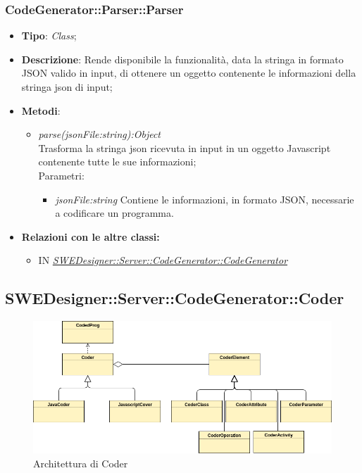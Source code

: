 \documentclass[../DefinizioneDiProdotto.tex]{subfiles}
\begin{document}
			\subsubsection{CodeGenerator::Parser::Parser}
			\hypertarget{SWEDesigner::Server::CodeGenerator::Parser::Parser}{}
			\begin{itemize}
				\item \textbf{Tipo}: \emph{Class};
				\item \textbf{Descrizione}: Rende disponibile la funzionalità, data la stringa in formato JSON valido in input, di ottenere un oggetto contenente le informazioni della stringa json di input;\\
				\item \textbf{Metodi}:
				\begin{itemize}
					\item \emph{parse(jsonFile:string):Object} \\ 
					Trasforma la stringa json ricevuta in input in un oggetto Javascript contenente tutte le sue informazioni; \\
					Parametri:
					\begin{itemize}
						\item \emph{jsonFile:string} Contiene le informazioni, in formato JSON, necessarie a codificare un programma.
					\end{itemize}
				\end{itemize}
				
				\item \textbf{Relazioni con le altre classi:}
				\begin{itemize}
					\item IN \hyperlink{SWEDesigner::Server::CodeGenerator::CodeGenerator}{\emph{SWEDesigner::Server::CodeGenerator::CodeGenerator}}
				\end{itemize}	
			\end{itemize}
			
			
			
			\subsection{SWEDesigner::Server::CodeGenerator::Coder}
			\begin{figure}[H]\label{fig:Coder}
				\centering
				\includegraphics[scale=0.46]{Immagini/DiagrammaArchitettura/Coder.png}
				\caption{Architettura di Coder}
			\end{figure}
			
\end{document}
